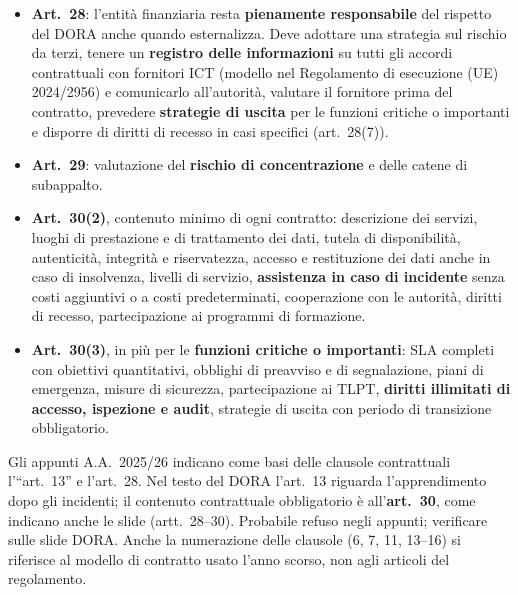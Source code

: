 \begin{integrazione}[artt.~28--30]
\begin{itemize}
  \item \textbf{Art.~28}: l'entità finanziaria resta \textbf{pienamente responsabile} del rispetto
    del DORA anche quando esternalizza. Deve adottare una strategia sul rischio da terzi, tenere un
    \textbf{registro delle informazioni} su tutti gli accordi contrattuali con fornitori ICT
    (modello nel Regolamento di esecuzione (UE) 2024/2956) e comunicarlo all'autorità, valutare il
    fornitore prima del contratto, prevedere \textbf{strategie di uscita} per le funzioni critiche o
    importanti e disporre di diritti di recesso in casi specifici (art.~28(7)).
  \item \textbf{Art.~29}: valutazione del \textbf{rischio di concentrazione} e delle catene di
    subappalto.
  \item \textbf{Art.~30(2)}, contenuto minimo di ogni contratto: descrizione dei servizi, luoghi di
    prestazione e di trattamento dei dati, tutela di disponibilità, autenticità, integrità e
    riservatezza, accesso e restituzione dei dati anche in caso di insolvenza, livelli di servizio,
    \textbf{assistenza in caso di incidente} senza costi aggiuntivi o a costi predeterminati,
    cooperazione con le autorità, diritti di recesso, partecipazione ai programmi di formazione.
  \item \textbf{Art.~30(3)}, in più per le \textbf{funzioni critiche o importanti}: SLA completi con
    obiettivi quantitativi, obblighi di preavviso e di segnalazione, piani di emergenza, misure di
    sicurezza, partecipazione ai TLPT, \textbf{diritti illimitati di accesso, ispezione e audit},
    strategie di uscita con periodo di transizione obbligatorio.
\end{itemize}
\end{integrazione}

\begin{verifica}
Gli appunti A.A.~2025/26 indicano come basi delle clausole contrattuali l'``art.~13'' e l'art.~28. Nel
testo del DORA l'art.~13 riguarda l'apprendimento dopo gli incidenti; il contenuto contrattuale
obbligatorio è all'\textbf{art.~30}, come indicano anche le slide (artt.~28--30). Probabile refuso negli
appunti; verificare sulle slide DORA. Anche la numerazione delle clausole (6, 7, 11, 13--16) si
riferisce al modello di contratto usato l'anno scorso, non agli articoli del regolamento.
\end{verifica}


